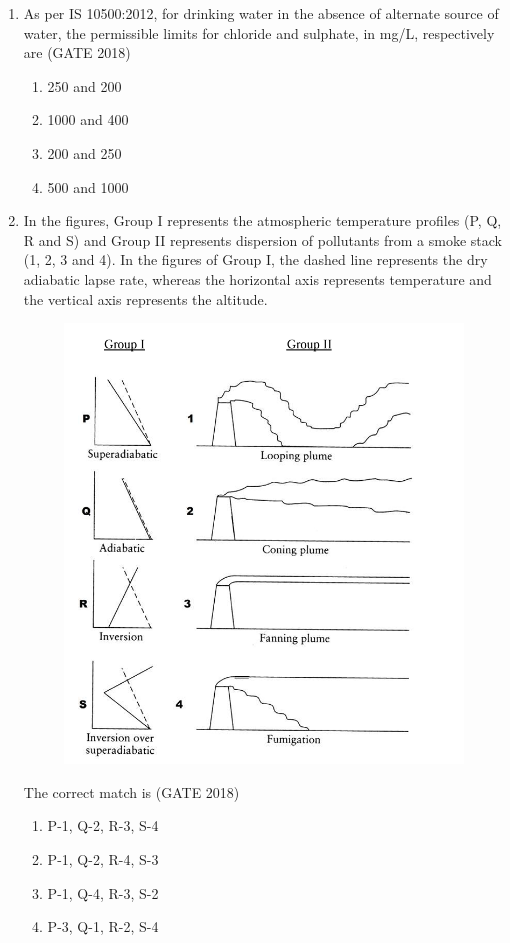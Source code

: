 \documentclass[journal,12pt,onecolumn]{IEEEtran}
\theoremstyle{remark}
\begin{document}
\begin{enumerate}
\item As per IS 10500:2012, for drinking water in the absence of alternate source of water, the permissible limits for chloride and sulphate, in mg/L, respectively are
\hfill{(GATE 2018)}
\begin{multicols}{4}
\begin{enumerate}
    \item 250 and 200
    \item 1000 and 400
    \item 200 and 250
    \item 500 and 1000
\end{enumerate}
\end{multicols}
\vspace{1cm}
\newpage
\item In the figures, Group I represents the atmospheric temperature profiles (P, Q, R and S) and Group II represents dispersion of pollutants from a smoke stack (1, 2, 3 and 4). In the figures of Group I, the dashed line represents the dry adiabatic lapse rate, whereas the horizontal axis represents temperature and the vertical axis represents the altitude.
\begin{figure}[h]
    \centering
    \includegraphics[width=0.5\linewidth]{GATE-CE-2018/15-2.png}
    \caption{}
    \label{15-2}
\end{figure}
The correct match is
\hfill{(GATE 2018)}
\begin{multicols}{4}
\begin{enumerate}
    \item P-1, Q-2, R-3, S-4
    \item P-1, Q-2, R-4, S-3
    \item P-1, Q-4, R-3, S-2
    \item P-3, Q-1, R-2, S-4
\end{enumerate}

\end{multicols}
\end{enumerate}
\end{document}
